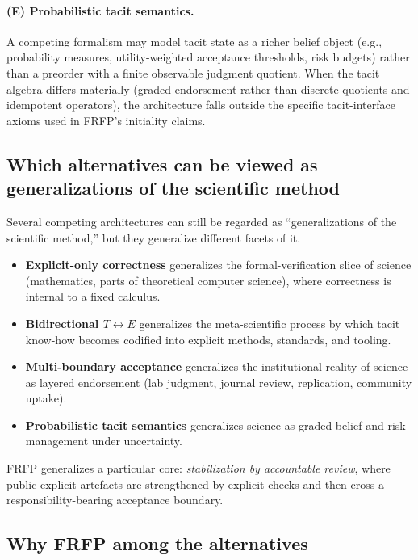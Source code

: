 \paragraph{(E) Probabilistic tacit semantics.}
A competing formalism may model tacit state as a richer belief object (e.g., probability measures,
utility-weighted acceptance thresholds, risk budgets) rather than a preorder with a finite observable
judgment quotient. When the tacit algebra differs materially (graded endorsement rather than discrete
quotients and idempotent operators), the architecture falls outside the specific tacit-interface axioms
used in FRFP's initiality claims.

\subsection{Which alternatives can be viewed as generalizations of the scientific method}

Several competing architectures can still be regarded as ``generalizations of the scientific method,''
but they generalize different facets of it.

\begin{itemize}[leftmargin=2em]
  \item \textbf{Explicit-only correctness} generalizes the formal-verification slice of science (mathematics, parts of theoretical computer science), where correctness is internal to a fixed calculus.
  \item \textbf{Bidirectional \(T\leftrightarrow E\)} generalizes the meta-scientific process by which tacit know-how becomes codified into explicit methods, standards, and tooling.
  \item \textbf{Multi-boundary acceptance} generalizes the institutional reality of science as layered endorsement (lab judgment, journal review, replication, community uptake).
  \item \textbf{Probabilistic tacit semantics} generalizes science as graded belief and risk management under uncertainty.
\end{itemize}
FRFP generalizes a particular core: \emph{stabilization by accountable review}, where public explicit
artefacts are strengthened by explicit checks and then cross a responsibility-bearing acceptance
boundary.

\subsection{Why FRFP among the alternatives}


